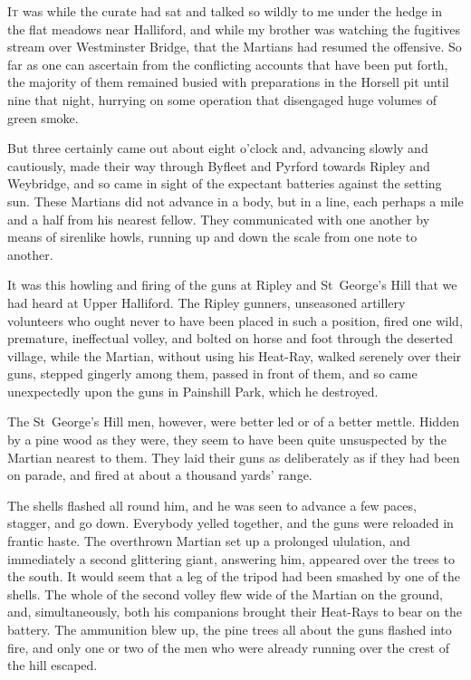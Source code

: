 

\lettrine[lines=4]{I}{t} was while the curate had sat and talked so wildly to me under the hedge in the flat meadows near Halliford, and while my brother was watching the fugitives stream over Westminster Bridge, that the Martians had resumed the offensive. So far as one can ascertain from the conflicting accounts that have been put forth, the majority of them remained busied with preparations in the Horsell pit until nine that night, hurrying on some operation that disengaged huge volumes of green smoke.

But three certainly came out about eight o'clock and, advancing slowly and cautiously, made their way through Byfleet and Pyrford towards Ripley and Weybridge, and so came in sight of the expectant batteries against the setting sun. These Martians did not advance in a body, but in a line, each perhaps a mile and a half from his nearest fellow. They communicated with one another by means of sirenlike howls, running up and down the scale from one note to another.

It was this howling and firing of the guns at Ripley and St~George's Hill that we had heard at Upper Halliford. The Ripley gunners, unseasoned artillery volunteers who ought never to have been placed in such a position, fired one wild, premature, ineffectual volley, and bolted on horse and foot through the deserted village, while the Martian, without using his Heat-Ray, walked serenely over their guns, stepped gingerly among them, passed in front of them, and so came unexpectedly upon the guns in Painshill Park, which he destroyed.

The St~George's Hill men, however, were better led or of a better mettle. Hidden by a pine wood as they were, they seem to have been quite unsuspected by the Martian nearest to them. They laid their guns as deliberately as if they had been on parade, and fired at about a thousand yards' range.

The shells flashed all round him, and he was seen to advance a few paces, stagger, and go down. Everybody yelled together, and the guns were reloaded in frantic haste. The overthrown Martian set up a prolonged ululation, and immediately a second glittering giant, answering him, appeared over the trees to the south. It would seem that a leg of the tripod had been smashed by one of the shells. The whole of the second volley flew wide of the Martian on the ground, and, simultaneously, both his companions brought their Heat-Rays to bear on the battery. The ammunition blew up, the pine trees all about the guns flashed into fire, and only one or two of the men who were already running over the crest of the hill escaped.

